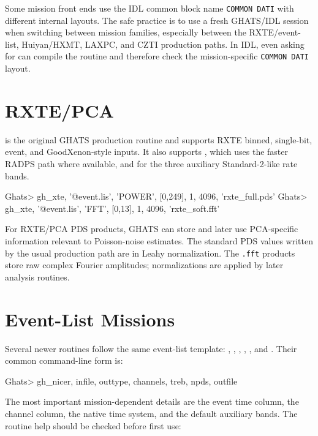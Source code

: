 \begin{ghatsnote}
Some mission front ends use the IDL common block name \texttt{COMMON DATI}
with different internal layouts.  The safe practice is to use a fresh GHATS/IDL
session when switching between mission families, especially between the
RXTE/event-list, Huiyan/HXMT, LAXPC, and CZTI production paths.  In IDL, even
asking for  can compile the routine and therefore check the
mission-specific \texttt{COMMON DATI} layout.
\end{ghatsnote}

\section{RXTE/PCA}

 is the original GHATS production routine and supports RXTE
binned, single-bit, event, and GoodXenon-style inputs.  It also supports
, which uses the faster RADPS path where available, and
 for the three auxiliary Standard-2-like rate bands.

\begin{ghatsconsole}
Ghats> gh_xte, '@event.lis', 'POWER', [0,249], 1, 4096, 'rxte_full.pds'
Ghats> gh_xte, '@event.lis', 'FFT',   [0,13],  1, 4096, 'rxte_soft.fft'
\end{ghatsconsole}

For RXTE/PCA PDS products, GHATS can store and later use PCA-specific
information relevant to Poisson-noise estimates.  The standard PDS values
written by the usual production path are in Leahy normalization.  The
\texttt{.fft} products store raw complex Fourier amplitudes; normalizations
are applied by later analysis routines.

\section{Event-List Missions}

Several newer routines follow the same event-list template:
, , , ,
, and .  Their common command-line form is:

\begin{ghatsconsole}
Ghats> gh_nicer, infile, outtype, channels, treb, npds, outfile
\end{ghatsconsole}

The most important mission-dependent details are the event time column, the
channel column, the native time system, and the default auxiliary bands.  The
routine help should be checked before first use:

